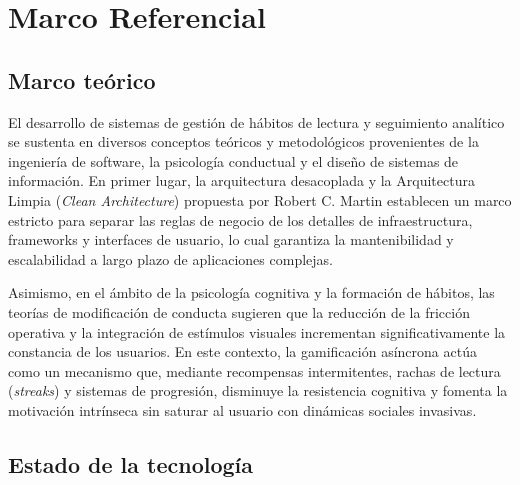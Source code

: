\documentclass[12pt, atypical, journal]{article}
\begin{document}
\section{Marco Referencial}

\subsection{Marco teórico}
El desarrollo de sistemas de gestión de hábitos de lectura y seguimiento analítico se sustenta en diversos conceptos teóricos y metodológicos provenientes de la ingeniería de software, la psicología conductual y el diseño de sistemas de información. En primer lugar, la arquitectura desacoplada y la Arquitectura Limpia (\textit{Clean Architecture}) propuesta por Robert C. Martin \cite{martin2018} establecen un marco estricto para separar las reglas de negocio de los detalles de infraestructura, frameworks y interfaces de usuario, lo cual garantiza la mantenibilidad y escalabilidad a largo plazo de aplicaciones complejas.

Asimismo, en el ámbito de la psicología cognitiva y la formación de hábitos, las teorías de modificación de conducta sugieren que la reducción de la fricción operativa y la integración de estímulos visuales incrementan significativamente la constancia de los usuarios. En este contexto, la gamificación asíncrona actúa como un mecanismo que, mediante recompensas intermitentes, rachas de lectura (\textit{streaks}) y sistemas de progresión, disminuye la resistencia cognitiva y fomenta la motivación intrínseca sin saturar al usuario con dinámicas sociales invasivas.

\subsection{Estado de la tecnología}
\end{document}
